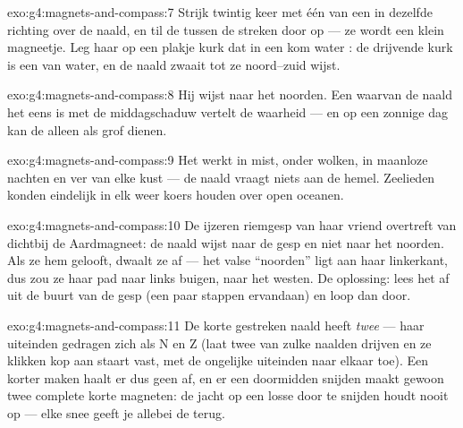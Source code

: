 \begin{solution}{exo:g4:magnets-and-compass:7}
Strijk twintig keer met één  van een  in dezelfde richting
over de naald, en til de  tussen de streken door op --- ze wordt
een klein magneetje. Leg haar op een plakje kurk dat in een kom water
: de drijvende kurk is een  van water, en de naald
zwaait tot ze noord--zuid wijst.
\end{solution}

\begin{solution}{exo:g4:magnets-and-compass:8}
Hij wijst naar het noorden. Een  waarvan de naald het eens is
met de middagschaduw vertelt de waarheid --- en op een zonnige dag kan
de  alleen als grof  dienen.
\end{solution}

\begin{solution}{exo:g4:magnets-and-compass:9}
Het werkt in mist, onder wolken, in maanloze nachten en ver van elke
kust --- de naald vraagt niets aan de hemel. Zeelieden konden eindelijk
in elk weer koers houden over open oceanen.
\end{solution}

\begin{solution}{exo:g4:magnets-and-compass:10}
De ijzeren riemgesp van haar vriend overtreft van dichtbij de
Aardmagneet: de naald wijst naar de gesp en niet naar het noorden.
Als ze hem gelooft, dwaalt ze af --- het valse ``noorden'' ligt aan
haar linkerkant, dus zou ze haar pad naar links buigen, naar het
westen. De oplossing: lees het  af uit de buurt van de gesp (een
paar stappen ervandaan) en loop dan door.
\end{solution}

\begin{solution}{exo:g4:magnets-and-compass:11}
De korte gestreken naald heeft \emph{twee}  --- haar uiteinden
gedragen zich als N en Z (laat twee van zulke naalden drijven en ze
klikken kop aan staart vast, met de ongelijke uiteinden naar elkaar
toe). Een  korter maken haalt er dus geen  af, en er een
doormidden snijden maakt gewoon twee complete korte magneten: de
jacht op een losse  door te snijden houdt nooit op --- elke snee
geeft je allebei de  terug.
\end{solution}
